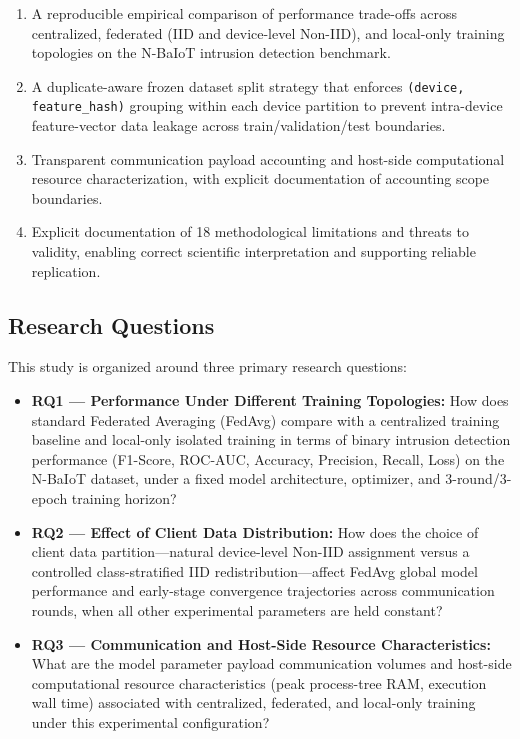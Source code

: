 \documentclass[11pt,a4paper]{article}
\begin{document}
\begin{enumerate}
    \item A reproducible empirical comparison of performance trade-offs across centralized, federated (IID and device-level Non-IID), and local-only training topologies on the N-BaIoT intrusion detection benchmark.
    \item A duplicate-aware frozen dataset split strategy that enforces \texttt{(device, feature\_hash)} grouping within each device partition to prevent intra-device feature-vector data leakage across train/validation/test boundaries.
    \item Transparent communication payload accounting and host-side computational resource characterization, with explicit documentation of accounting scope boundaries.
    \item Explicit documentation of 18 methodological limitations and threats to validity, enabling correct scientific interpretation and supporting reliable replication.
\end{enumerate}

\subsection{Research Questions}
This study is organized around three primary research questions:

\begin{itemize}
    \item \textbf{RQ1 — Performance Under Different Training Topologies:} How does standard Federated Averaging (FedAvg) compare with a centralized training baseline and local-only isolated training in terms of binary intrusion detection performance (F1-Score, ROC-AUC, Accuracy, Precision, Recall, Loss) on the N-BaIoT dataset, under a fixed model architecture, optimizer, and 3-round/3-epoch training horizon?
    \item \textbf{RQ2 — Effect of Client Data Distribution:} How does the choice of client data partition—natural device-level Non-IID assignment versus a controlled class-stratified IID redistribution—affect FedAvg global model performance and early-stage convergence trajectories across communication rounds, when all other experimental parameters are held constant?
    \item \textbf{RQ3 — Communication and Host-Side Resource Characteristics:} What are the model parameter payload communication volumes and host-side computational resource characteristics (peak process-tree RAM, execution wall time) associated with centralized, federated, and local-only training under this experimental configuration?
\end{itemize}
\end{document}
